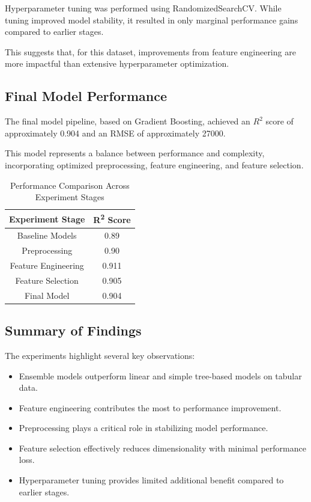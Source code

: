 \documentclass[conference]{IEEEtran}
\begin{document}
Hyperparameter tuning was performed using RandomizedSearchCV. While tuning improved model stability, it resulted in only marginal performance gains compared to earlier stages.

This suggests that, for this dataset, improvements from feature engineering are more impactful than extensive hyperparameter optimization.

\subsection{Final Model Performance}

The final model pipeline, based on Gradient Boosting, achieved an $R^2$ score of approximately 0.904 and an RMSE of approximately 27000.

This model represents a balance between performance and complexity, incorporating optimized preprocessing, feature engineering, and feature selection.

\begin{table}[h]
\centering
\caption{Performance Comparison Across Experiment Stages}
\begin{tabular}{|c|c|}
\hline
\textbf{Experiment Stage} & \textbf{R\textsuperscript{2} Score} \\
\hline
Baseline Models & 0.89 \\
Preprocessing & 0.90 \\
Feature Engineering & 0.911 \\
Feature Selection & 0.905 \\
Final Model & 0.904 \\
\hline
\end{tabular}
\end{table}

\subsection{Summary of Findings}

The experiments highlight several key observations:

\begin{itemize}
\item Ensemble models outperform linear and simple tree-based models on tabular data.
\item Feature engineering contributes the most to performance improvement.
\item Preprocessing plays a critical role in stabilizing model performance.
\item Feature selection effectively reduces dimensionality with minimal performance loss.
\item Hyperparameter tuning provides limited additional benefit compared to earlier stages.
\end{itemize}
\end{document}
